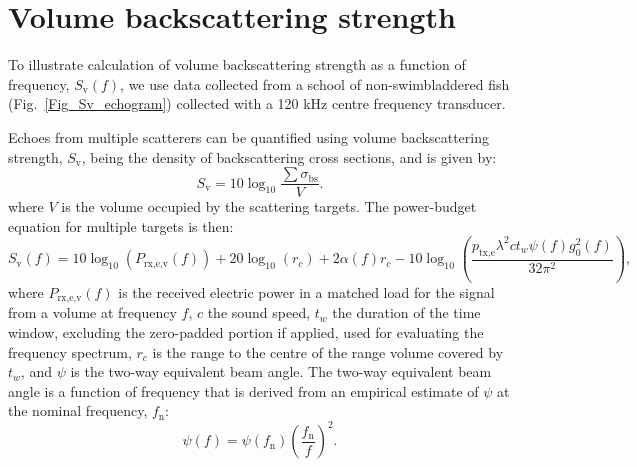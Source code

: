 \documentclass[preprint,12pt,TurnOnLineNumbers]{JASAnew}
\newcommand{\freqsym}{f}
\newcommand{\fn}{f_{\textrm{n}}}
\newcommand{\ptxe}{p_{\textrm{tx,e}}}
\newcommand{\prxevf}{P_{\textrm{rx,e,v}}}
\newcommand{\tslide}{t_w}
\newcommand{\bs}{\sigma_{\textrm{bs}}}
\newcommand{\sv}{S_{\textrm{v}}}
\newcommand{\range}{r}
\newcommand{\gainzero}{g_0}
\newcommand{\eqang}{\psi}
\newcommand{\wlen}{\lambda}
\newcommand{\cw}{c}
\newcommand{\absorp}{\alpha}
\begin{document}
\section{Volume backscattering strength}

To illustrate calculation of volume backscattering strength as a function of frequency,  $\sv(f)$, we use data collected from a school of non-swimbladdered fish (Fig.~\ref{Fig_Sv_echogram}) collected with a 120 kHz centre frequency transducer. 

Echoes from multiple scatterers can be quantified using volume backscattering strength, $\sv$, being the density of backscattering cross sections, and is given by:
%
\begin{equation}
\label{eq:sv}
\sv  =  10\log_{10}\frac{\sum\bs}{V}.
\end{equation}
%
where $V$ is the volume occupied by the scattering targets. The power-budget equation for multiple targets is then:
%
\begin{equation}
\label{eq:sv_f}
\sv(\freqsym) = 10\log_{10}(\prxevf(\freqsym)) + 20\log_{10}(\range_c) + 2\absorp(\freqsym)\range_c 
- 10\log_{10}\left( \frac{\ptxe \wlen^2 \cw \tslide \eqang(\freqsym) \gainzero^2(\freqsym)}{32\pi^2} \right), 
\end{equation}
%
where $\prxevf(\freqsym)$ is the received electric power in a matched load for the signal from a volume at frequency $\freqsym$, $\cw$ the sound speed, $\tslide$ the duration of the time window, excluding the zero-padded portion if applied, used for evaluating the frequency spectrum, $\range_c$ is the range to the centre of the range volume covered by $\tslide$, and $\eqang$ is the two-way equivalent beam angle. The two-way equivalent beam angle is a function of frequency that is derived from an empirical estimate of $\eqang$ at the nominal frequency, $\fn$:
\begin{equation}
\label{eq:PsiFc}
\eqang(f) = \eqang(\fn)\left(\frac{\fn}{f}\right)^2.
\end{equation}
\end{document}
